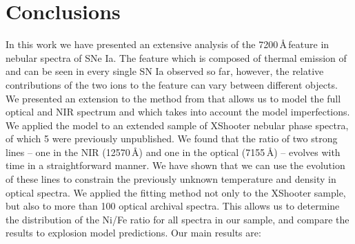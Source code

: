 \documentclass[fleqn,usenatbib]{mnras}
\begin{document}
\section{Conclusions}
In this work we have presented an extensive analysis of the 7200\,\AA\,feature in nebular spectra of SNe Ia. The feature which is composed of thermal emission of  and  can be seen in every single SN Ia observed so far, however, the relative contributions of the two ions to the feature can vary between different objects. We presented an extension to the method from \citet{2018A&A...620A.200F} that allows us to model the full optical and NIR spectrum and which takes into account the model imperfections. We applied the model to an extended sample of XShooter nebular phase spectra, of which 5 were previously unpublished. We found that the ratio of two strong  lines -- one in the NIR (12570\,\AA) and one in the optical (7155\,\AA) -- evolves with time in a straightforward manner. We have shown that we can use the evolution of these lines to constrain the previously unknown temperature and density in optical spectra. We applied the fitting method not only to the XShooter sample, but also to more than 100 optical archival spectra. This allows us to determine the distribution of the Ni/Fe ratio for all spectra in our sample, and compare the results to explosion model predictions. 
Our main results are:
\end{document}
